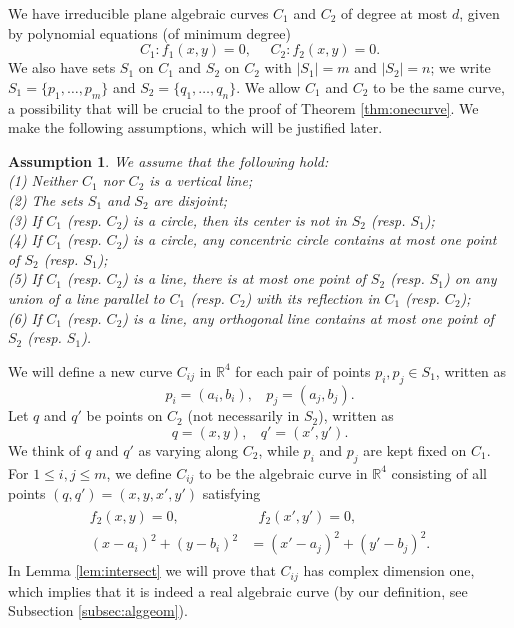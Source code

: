 \documentclass[12pt]{article}
\newtheorem{assumption}[theorem]{Assumption}
\newcommand{\RR}{\mathbb R}
\begin{document}
We have irreducible plane algebraic curves $C_1$ and $C_2$ of degree at most $d$,
given by polynomial equations (of minimum degree)
$$C_1:f_1(x,y)=0,~~~~~~C_2:f_2(x,y)=0.$$
We also have sets $S_1$ on $C_1$ and $S_2$ on $C_2$ with $|S_1| = m$ and $|S_2| = n$;
we write $S_1 = \{p_1,\ldots,p_m\}$ and $S_2 = \{q_1,\ldots,q_n\}$.
We allow $C_1$ and $C_2$ to be the same curve, 
a possibility that will be crucial to the proof of Theorem \ref{thm:onecurve}.
We make the following assumptions, 
which will be justified later.
\begin{assumption}\label{assumption}
 We assume that the following hold:\\
 \emph{(1)} Neither $C_1$ nor $C_2$ is a vertical line;\\
 \emph{(2)} The sets $S_1$ and $S_2$ are disjoint;\\%
 \emph{(3)} If $C_1$ (resp. $C_2$) is a circle, then its center is not in $S_2$ (resp. $S_1$);\\
 \emph{(4)} If $C_1$ (resp. $C_2$) is a circle, 
 any concentric circle contains at most one point of $S_2$ (resp. $S_1$);\\
 \emph{(5)} If $C_1$ (resp. $C_2$) is a line, 
 there is at most one point of $S_2$ (resp. $S_1$) 
 on any union of a line parallel to $C_1$ (resp. $C_2$)
 with its reflection in $C_1$ (resp. $C_2$);\\
 \emph{(6)} If $C_1$ (resp. $C_2$) is a line, 
 any orthogonal line contains at most one point of $S_2$ (resp. $S_1$). 
\end{assumption}

We will define a new curve $C_{ij}$ in $\RR^4$ 
for each pair of points $p_i, p_j\in S_1$, written as
$$p_i = (a_i, b_i),~~~~p_j = (a_j, b_j).$$
Let $q$ and $q'$ be points on $C_2$ (not necessarily in $S_2$), written as
$$q = (x, y),~~~~q' = (x', y').$$
We think of $q$ and $q'$ as varying along $C_2$, 
while $p_i$ and $p_j$ are kept fixed on $C_1$.
For $1\leq i,j \leq m$, we define $C_{ij}$ to be the algebraic curve in $\RR^4$ 
consisting of all points $(q,q') = (x,y,x',y')$ satisfying
\begin{align}\label{eq:defcij}
\begin{split}
 f_2(x,y)=0,&~~~f_2(x',y')=0,\\
 (x-a_i)^2 + (y-b_i)^2 &= (x'-a_j)^2 + (y'-b_j)^2.
 \end{split}
\end{align}
In Lemma \ref{lem:intersect} we will prove that $C_{ij}$ has complex dimension one,
which implies that it is indeed a real algebraic curve (by our definition, see Subsection \ref{subsec:alggeom}).
   
\end{document}
